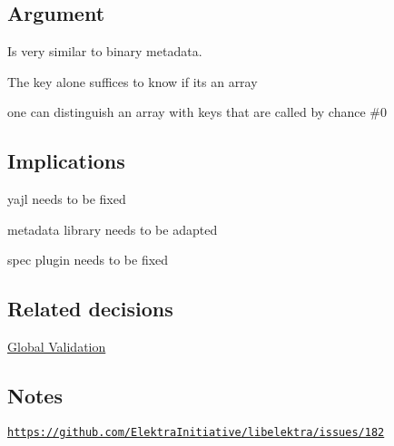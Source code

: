 

\subsection*{Argument}


\begin{DoxyItemize}
\item Is very similar to {\ttfamily binary} metadata.
\item The key alone suffices to know if its an array
\item one can distinguish an array with keys that are called by chance \#0
\end{DoxyItemize}

\subsection*{Implications}


\begin{DoxyItemize}
\item yajl needs to be fixed
\item metadata library needs to be adapted
\item spec plugin needs to be fixed
\end{DoxyItemize}

\subsection*{Related decisions}


\begin{DoxyItemize}
\item \hyperlink{doc_decisions_global_validation_md}{Global Validation}
\end{DoxyItemize}

\subsection*{Notes}

\href{https://github.com/ElektraInitiative/libelektra/issues/182}{\tt https\+://github.\+com/\+Elektra\+Initiative/libelektra/issues/182} 